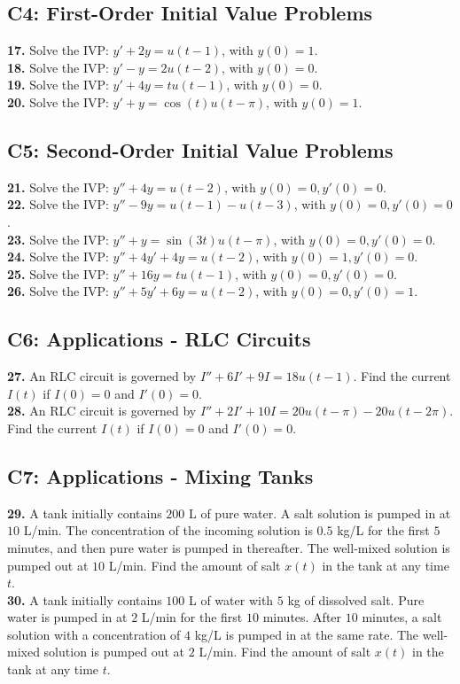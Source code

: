 \documentclass[11pt, letterpaper]{article}
\theoremstyle{definition}
\theoremstyle{remark}
\begin{document}
\subsection{C4: First-Order Initial Value Problems}
\textbf{17.} Solve the IVP: $y' + 2y = u(t-1)$, with $y(0) = 1$. \\
\textbf{18.} Solve the IVP: $y' - y = 2u(t-2)$, with $y(0) = 0$. \\
\textbf{19.} Solve the IVP: $y' + 4y = t u(t-1)$, with $y(0) = 0$. \\
\textbf{20.} Solve the IVP: $y' + y = \cos(t) u(t-\pi)$, with $y(0) = 1$.

\subsection{C5: Second-Order Initial Value Problems}
\textbf{21.} Solve the IVP: $y'' + 4y = u(t-2)$, with $y(0) = 0, y'(0) = 0$. \\
\textbf{22.} Solve the IVP: $y'' - 9y = u(t-1) - u(t-3)$, with $y(0) = 0, y'(0) = 0$. \\
\textbf{23.} Solve the IVP: $y'' + y = \sin(3t) u(t-\pi)$, with $y(0) = 0, y'(0) = 0$. \\
\textbf{24.} Solve the IVP: $y'' + 4y' + 4y = u(t-2)$, with $y(0) = 1, y'(0) = 0$. \\
\textbf{25.} Solve the IVP: $y'' + 16y = t u(t-1)$, with $y(0) = 0, y'(0) = 0$. \\
\textbf{26.} Solve the IVP: $y'' + 5y' + 6y = u(t-2)$, with $y(0) = 0, y'(0) = 1$.

\subsection{C6: Applications - RLC Circuits}
\textbf{27.} An RLC circuit is governed by $I'' + 6I' + 9I = 18u(t-1)$. Find the current $I(t)$ if $I(0) = 0$ and $I'(0) = 0$. \\
\textbf{28.} An RLC circuit is governed by $I'' + 2I' + 10I = 20u(t-\pi) - 20u(t-2\pi)$. Find the current $I(t)$ if $I(0) = 0$ and $I'(0) = 0$.

\subsection{C7: Applications - Mixing Tanks}
\textbf{29.} A tank initially contains $200$ L of pure water. A salt solution is pumped in at $10$ L/min. The concentration of the incoming solution is $0.5$ kg/L for the first $5$ minutes, and then pure water is pumped in thereafter. The well-mixed solution is pumped out at $10$ L/min. Find the amount of salt $x(t)$ in the tank at any time $t$. \\
\textbf{30.} A tank initially contains $100$ L of water with $5$ kg of dissolved salt. Pure water is pumped in at $2$ L/min for the first $10$ minutes. After $10$ minutes, a salt solution with a concentration of $4$ kg/L is pumped in at the same rate. The well-mixed solution is pumped out at $2$ L/min. Find the amount of salt $x(t)$ in the tank at any time $t$.
\end{document}

